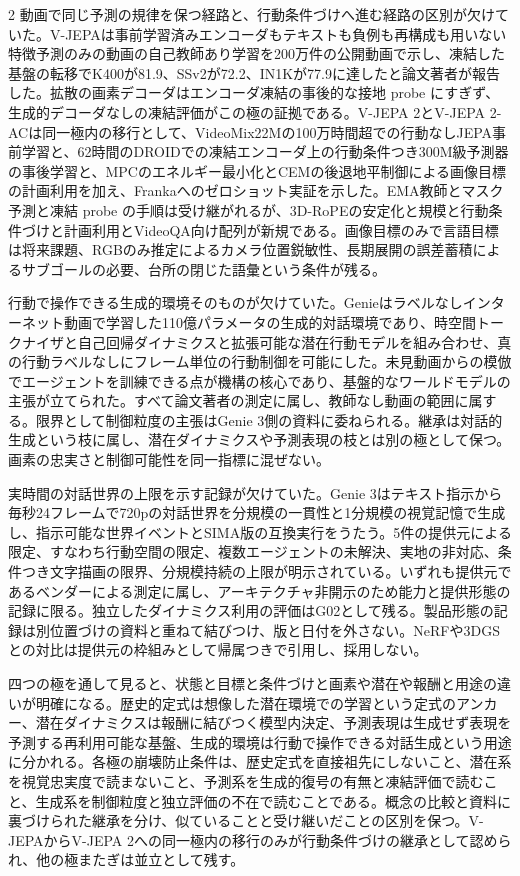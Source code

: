 \documentclass[lualatex,a4paper,10pt]{jlreq}
\begin{document}
\begin{multicols}{2}
\noindent 動画で同じ予測の規律を保つ経路と、行動条件づけへ進む経路の区別が欠けていた。V-JEPAは事前学習済みエンコーダもテキストも負例も再構成も用いない特徴予測のみの動画の自己教師あり学習を200万件の公開動画で示し、凍結した基盤の転移でK400が81.9、SSv2が72.2、IN1Kが77.9に達したと論文著者が報告した。拡散の画素デコーダはエンコーダ凍結の事後的な接地 probe にすぎず、生成的デコーダなしの凍結評価がこの極の証拠である。V-JEPA 2とV-JEPA 2-ACは同一極内の移行として、VideoMix22Mの100万時間超での行動なしJEPA事前学習と、62時間のDROIDでの凍結エンコーダ上の行動条件つき300M級予測器の事後学習と、MPCのエネルギー最小化とCEMの後退地平制御による画像目標の計画利用を加え、Frankaへのゼロショット実証を示した。EMA教師とマスク予測と凍結 probe の手順は受け継がれるが、3D-RoPEの安定化と規模と行動条件づけと計画利用とVideoQA向け配列が新規である。画像目標のみで言語目標は将来課題、RGBのみ推定によるカメラ位置鋭敏性、長期展開の誤差蓄積によるサブゴールの必要、台所の閉じた語彙という条件が残る。\autocite{vmd104,vmd121}\par\medskip
\noindent 行動で操作できる生成的環境そのものが欠けていた。Genieはラベルなしインターネット動画で学習した110億パラメータの生成的対話環境であり、時空間トークナイザと自己回帰ダイナミクスと拡張可能な潜在行動モデルを組み合わせ、真の行動ラベルなしにフレーム単位の行動制御を可能にした。未見動画からの模倣でエージェントを訓練できる点が機構の核心であり、基盤的なワールドモデルの主張が立てられた。すべて論文著者の測定に属し、教師なし動画の範囲に属する。限界として制御粒度の主張はGenie 3側の資料に委ねられる。継承は対話的生成という枝に属し、潜在ダイナミクスや予測表現の枝とは別の極として保つ。画素の忠実さと制御可能性を同一指標に混ぜない。\autocite{vmd105}\par\medskip
\noindent 実時間の対話世界の上限を示す記録が欠けていた。Genie 3はテキスト指示から毎秒24フレームで720pの対話世界を分規模の一貫性と1分規模の視覚記憶で生成し、指示可能な世界イベントとSIMA版の互換実行をうたう。5件の提供元による限定、すなわち行動空間の限定、複数エージェントの未解決、実地の非対応、条件つき文字描画の限界、分規模持続の上限が明示されている。いずれも提供元であるベンダーによる測定に属し、アーキテクチャ非開示のため能力と提供形態の記録に限る。独立したダイナミクス利用の評価はG02として残る。製品形態の記録は別位置づけの資料と重ねて結びつけ、版と日付を外さない。NeRFや3DGSとの対比は提供元の枠組みとして帰属つきで引用し、採用しない。\autocite{vmd106,vmd107}\par\medskip
\noindent 四つの極を通して見ると、状態と目標と条件づけと画素や潜在や報酬と用途の違いが明確になる。歴史的定式は想像した潜在環境での学習という定式のアンカー、潜在ダイナミクスは報酬に結びつく模型内決定、予測表現は生成せず表現を予測する再利用可能な基盤、生成的環境は行動で操作できる対話生成という用途に分かれる。各極の崩壊防止条件は、歴史定式を直接祖先にしないこと、潜在系を視覚忠実度で読まないこと、予測系を生成的復号の有無と凍結評価で読むこと、生成系を制御粒度と独立評価の不在で読むことである。概念の比較と資料に裏づけられた継承を分け、似ていることと受け継いだことの区別を保つ。V-JEPAからV-JEPA 2への同一極内の移行のみが行動条件づけの継承として認められ、他の極またぎは並立として残す。\autocite{vmd101,vmd102,vmd103,vmd104,vmd105,vmd106,vmd107,vmd121}\par\medskip
\end{multicols}
\end{document}
